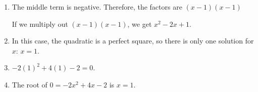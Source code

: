 {\begin{mdframed}[linewidth=4, leftmargin=40, rightmargin=40]
\begin{exercise}
\begin{enumerate}[noitemsep, label=\textbf{Step} \textbf{\arabic*}. ]
{\begin{minipage}{\columnwidth}
    \parbox[t]{\mymathboxwidth}{\large$
    -2{x}^{2}+4x-2=0{x}^{2}-2x+1=0$}\hfill
    \parbox[t]{48pt}{\raggedleft 
    (9.37)}
    \end{minipage}\vspace{12pt}\par
    }%
        \item  
        \label{m39247*id153076}The middle term is negative. Therefore, the factors are $\left(x-1\right)\left(x-1\right)$\par 
        \label{m39247*id153108}If we multiply out $\left(x-1\right)\left(x-1\right)$, we get ${x}^{2}-2x+1$.\par 
        \item  
        \label{m39247*id153172}\nopagebreak\noindent{}
        \label{m39247*id153229}In this case, the quadratic is a perfect square, so there is only one solution
for $x$: $x=1$.\par 
        \item  
        \label{m39247*id1532632}$-2{\left(1\right)}^{2}+4\left(1\right)-2=0$.
 \par 
        \item  
        \label{m39247*id153262}The root of $0=-2{x}^{2}+4x-2$ is $x=1$.
 \par 
        \end{enumerate}
    \end{exercise}
    \end{mdframed}
    }
    \noindent
\label{m39247*secfhsst!!!underscore!!!id2946}
